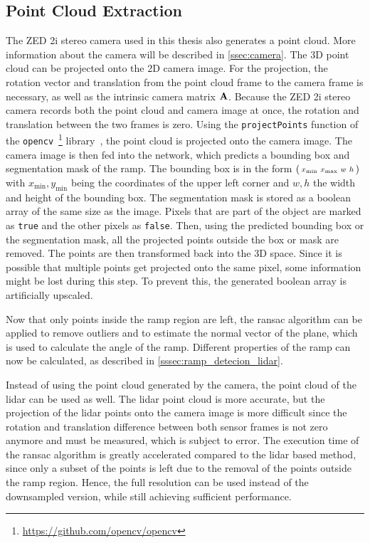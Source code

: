 \subsection{Point Cloud Extraction}
\label{ssec:point_cloud_extraction}
The ZED 2i stereo camera used in this thesis also generates a point cloud.
More information about the camera will be described in \cref{ssec:camera}.
The 3D point cloud can be projected onto the 2D camera image.
For the projection, the rotation vector and translation from the point cloud frame to the camera frame is necessary, as well as the intrinsic camera matrix $\vb{A}$.
Because the ZED 2i stereo camera records both the point cloud and camera image at once, the rotation and translation between the two frames is zero.
Using the \texttt{projectPoints} function of the \texttt{opencv}~\footnote{\url{https://github.com/opencv/opencv}} library~\cite{Bradski2000}, the point cloud is projected onto the camera image.
The camera image is then fed into the network, which predicts a bounding box and segmentation mask of the ramp.
The bounding box is in the form  $\smqty(x_\mathrm{min} & x_\mathrm{max} & w & h)$ with $x_\mathrm{min}, y_\mathrm{min} $ being the coordinates of the upper left corner and $w, h$ the width and height of the bounding box.
The segmentation mask is stored as a boolean array of the same size as the image.
Pixels that are part of the object are marked as \texttt{true} and the other pixels as \texttt{false}.
Then, using the predicted bounding box or the segmentation mask, all the projected points outside the box or mask are removed.
The points are then transformed back into the 3D space.
Since it is possible that multiple points get projected onto the same pixel, some information might be lost during this step.
To prevent this, the generated boolean array is artificially upscaled.

Now that only points inside the ramp region are left, the \gls{ransac} algorithm can be applied to remove outliers and to estimate the normal vector of the plane, which is used to calculate the angle of the ramp.
Different properties of the ramp can now be calculated, as described in \cref{sssec:ramp_detecion_lidar}.

Instead of using the point cloud generated by the camera, the point cloud of the \gls{lidar} can be used as well.
The \gls{lidar} point cloud is more accurate, but the projection of the \gls{lidar} points onto the camera image is more difficult since the rotation and translation difference between both sensor frames is not zero anymore and must be measured, which is subject to error.
The execution time of the \gls{ransac} algorithm is greatly accelerated compared to the \gls{lidar} based method, since only a subset of the points is left due to the removal of the points outside the ramp region.
Hence, the full resolution can be used instead of the downsampled version, while still achieving sufficient performance.